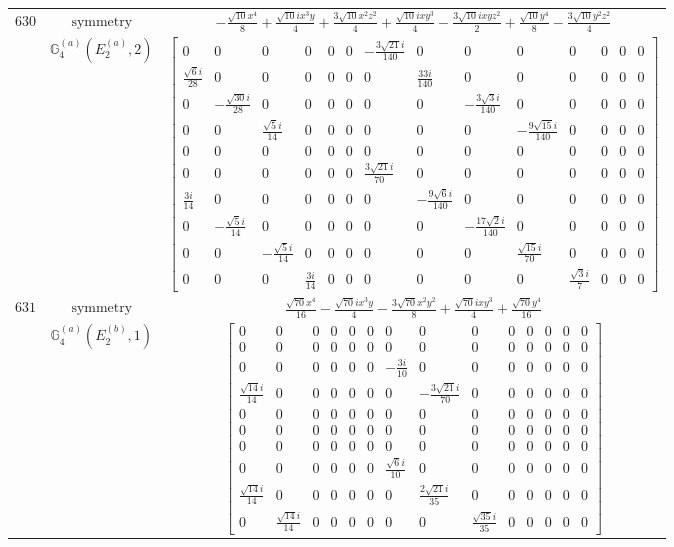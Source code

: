 \documentclass[fleqn,8pt,landscape]{jsarticle}
\begin{document}
\begin{longtable}{ccc}
$ 630 $ & $ \text{symmetry} $ & $ - \frac{\sqrt{10} x^{4}}{8} + \frac{\sqrt{10} i x^{3} y}{4} + \frac{3 \sqrt{10} x^{2} z^{2}}{4} + \frac{\sqrt{10} i x y^{3}}{4} - \frac{3 \sqrt{10} i x y z^{2}}{2} + \frac{\sqrt{10} y^{4}}{8} - \frac{3 \sqrt{10} y^{2} z^{2}}{4} $ \\
$  $ & $ \mathbb{G}_{4}^{(a)}(E_{2}^{(a)},2) $ & $ \begin{bmatrix} 0 & 0 & 0 & 0 & 0 & 0 & - \frac{3 \sqrt{21} i}{140} & 0 & 0 & 0 & 0 & 0 & 0 & 0 \\ \frac{\sqrt{6} i}{28} & 0 & 0 & 0 & 0 & 0 & 0 & \frac{33 i}{140} & 0 & 0 & 0 & 0 & 0 & 0 \\ 0 & - \frac{\sqrt{30} i}{28} & 0 & 0 & 0 & 0 & 0 & 0 & - \frac{3 \sqrt{3} i}{140} & 0 & 0 & 0 & 0 & 0 \\ 0 & 0 & \frac{\sqrt{5} i}{14} & 0 & 0 & 0 & 0 & 0 & 0 & - \frac{9 \sqrt{15} i}{140} & 0 & 0 & 0 & 0 \\ 0 & 0 & 0 & 0 & 0 & 0 & 0 & 0 & 0 & 0 & 0 & 0 & 0 & 0 \\ 0 & 0 & 0 & 0 & 0 & 0 & \frac{3 \sqrt{21} i}{70} & 0 & 0 & 0 & 0 & 0 & 0 & 0 \\ \frac{3 i}{14} & 0 & 0 & 0 & 0 & 0 & 0 & - \frac{9 \sqrt{6} i}{140} & 0 & 0 & 0 & 0 & 0 & 0 \\ 0 & - \frac{\sqrt{5} i}{14} & 0 & 0 & 0 & 0 & 0 & 0 & - \frac{17 \sqrt{2} i}{140} & 0 & 0 & 0 & 0 & 0 \\ 0 & 0 & - \frac{\sqrt{5} i}{14} & 0 & 0 & 0 & 0 & 0 & 0 & \frac{\sqrt{15} i}{70} & 0 & 0 & 0 & 0 \\ 0 & 0 & 0 & \frac{3 i}{14} & 0 & 0 & 0 & 0 & 0 & 0 & \frac{\sqrt{3} i}{7} & 0 & 0 & 0 \end{bmatrix} $ \\ \hline
$ 631 $ & $ \text{symmetry} $ & $ \frac{\sqrt{70} x^{4}}{16} - \frac{\sqrt{70} i x^{3} y}{4} - \frac{3 \sqrt{70} x^{2} y^{2}}{8} + \frac{\sqrt{70} i x y^{3}}{4} + \frac{\sqrt{70} y^{4}}{16} $ \\
$  $ & $ \mathbb{G}_{4}^{(a)}(E_{2}^{(b)},1) $ & $ \begin{bmatrix} 0 & 0 & 0 & 0 & 0 & 0 & 0 & 0 & 0 & 0 & 0 & 0 & 0 & 0 \\ 0 & 0 & 0 & 0 & 0 & 0 & 0 & 0 & 0 & 0 & 0 & 0 & 0 & 0 \\ 0 & 0 & 0 & 0 & 0 & 0 & - \frac{3 i}{10} & 0 & 0 & 0 & 0 & 0 & 0 & 0 \\ \frac{\sqrt{14} i}{14} & 0 & 0 & 0 & 0 & 0 & 0 & - \frac{3 \sqrt{21} i}{70} & 0 & 0 & 0 & 0 & 0 & 0 \\ 0 & 0 & 0 & 0 & 0 & 0 & 0 & 0 & 0 & 0 & 0 & 0 & 0 & 0 \\ 0 & 0 & 0 & 0 & 0 & 0 & 0 & 0 & 0 & 0 & 0 & 0 & 0 & 0 \\ 0 & 0 & 0 & 0 & 0 & 0 & 0 & 0 & 0 & 0 & 0 & 0 & 0 & 0 \\ 0 & 0 & 0 & 0 & 0 & 0 & \frac{\sqrt{6} i}{10} & 0 & 0 & 0 & 0 & 0 & 0 & 0 \\ \frac{\sqrt{14} i}{14} & 0 & 0 & 0 & 0 & 0 & 0 & \frac{2 \sqrt{21} i}{35} & 0 & 0 & 0 & 0 & 0 & 0 \\ 0 & \frac{\sqrt{14} i}{14} & 0 & 0 & 0 & 0 & 0 & 0 & \frac{\sqrt{35} i}{35} & 0 & 0 & 0 & 0 & 0 \end{bmatrix} $ \\ \hline

\end{longtable}
\end{document}
